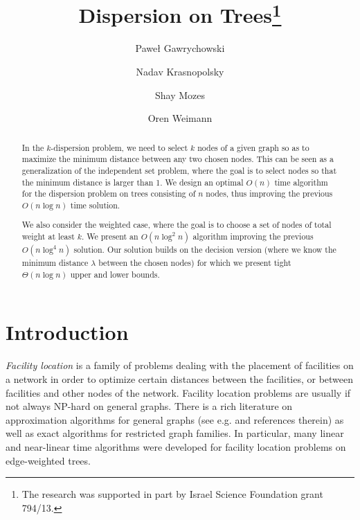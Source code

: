 \documentclass[11pt,a4paper]{article}
\newcommand{\Oh}{{O}}
\theoremstyle{definition}
\theoremstyle{remark}
\begin{document}
\title{Dispersion on Trees\thanks{The research was supported in part by Israel Science Foundation grant 794/13.}}
\author[1]{Pawe\l{} Gawrychowski}
\author[1]{Nadav Krasnopolsky}
\author[2]{Shay Mozes}
\author[1]{Oren Weimann}


\date{}
\maketitle

\begin{abstract}
In the $k$-dispersion problem, we need to select $k$ nodes of a given graph so as to maximize
the minimum distance between any two chosen nodes. This can be seen as a generalization
of the independent set problem, where the goal is to select nodes so that the minimum distance
is larger than 1.
We design an optimal $\Oh(n)$ time algorithm for the dispersion problem on trees consisting
of $n$ nodes, thus improving the previous $\Oh(n\log n)$ time solution. 

We also consider the weighted case, where the goal is to choose a set of nodes of total weight at least $k$. We present an $\Oh(n\log^2n)$ algorithm improving the previous $\Oh(n\log^4 n)$ solution. Our solution builds on the decision version (where we know the minimum distance $\lambda$ between the chosen nodes) for which we present tight $\Theta(n\log n)$ upper and lower bounds. 
\end{abstract}

\section{Introduction}

\emph{Facility location} is a family of problems dealing with the placement of facilities on a network in order to optimize certain distances between the facilities, or between facilities and other nodes of the network. Facility location problems are usually if not always NP-hard on general graphs. There is a rich literature on approximation algorithms for general graphs (see e.g.\cite{DavidB.Shmoys1997,Vazirani2003} and references therein) as well as exact algorithms for restricted graph families. In particular, many linear and near-linear time algorithms were developed for facility location problems on edge-weighted trees.   
\end{document}
